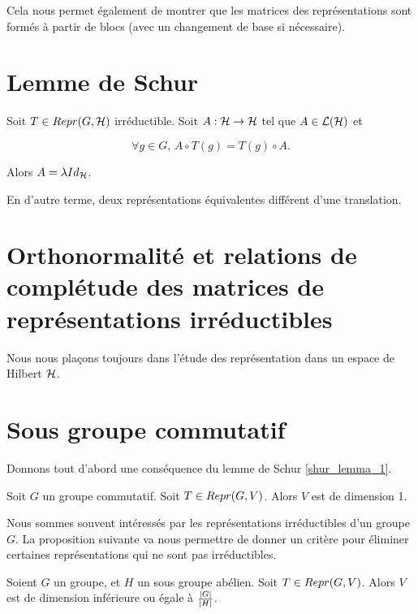 Cela nous permet également de montrer que les matrices des représentations sont
formés à partir de blocs (avec un changement de base si nécessaire).

\section{Lemme de Schur}

\begin{proposition} 
	\label{shur_lemma_1}
	Soit $T \in Repr(G, \mathcal{H})$ irréductible.
	Soit $A : \mathcal{H} \rightarrow \mathcal{H}$
	tel que $A \in \mathcal{L}(\mathcal{H})$ et

	\begin{equation}
		\forall g \in G, \, A \circ T(g) = T(g) \circ A.
	\end{equation}

	Alors $A = \lambda Id_{\mathcal{H}}$.

	En d'autre terme, deux représentations équivalentes différent d'une
	translation.
\end{proposition}

\section{Orthonormalité et relations de complétude des matrices de
représentations irréductibles}

Nous nous plaçons toujours dans l'étude des représentation dans un espace de
Hilbert $\mathcal{H}$.



\section{Sous groupe commutatif}

Donnons tout d'abord une conséquence du lemme de Schur \ref{shur_lemma_1}.

\begin{proposition}
	Soit $G$ un groupe commutatif.
	Soit $T \in Repr(G, V)$. Alors $V$ est de dimension 1.
\end{proposition}

Nous sommes souvent intéressés par les représentations irréductibles d'un groupe
$G$. La proposition suivante va nous permettre de donner un critère pour
éliminer certaines représentations qui ne sont pas irréductibles.

\begin{proposition}
	Soient $G$ un groupe, et $H$ un sous groupe abélien.
	Soit $T \in Repr(G, V)$.
	Alors $V$ est de dimension inférieure ou égale à
	$\frac{|G|}{|H|}$.
\end{proposition}
